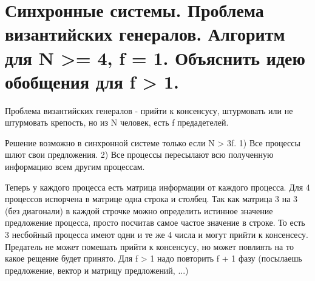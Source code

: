 \section{Синхронные системы. Проблема византийских генералов. Алгоритм для N >= 4, f = 1. Объяснить идею обобщения для f > 1.}

Проблема византийских генералов - прийти к консенсусу, штурмовать или не штурмовать крепость, но из N человек, есть f предадетелей.

Решение возможно в синхронной системе только если N > 3f.
1) Все процессы шлют свои предложения.
2) Все процессы пересылают всю полученную информацию всем другим процессам.

Теперь у каждого процесса есть матрица информации от каждого процесса.
Для 4 процессов испорчена в матрице одна строка и столбец. Так как матрица 3 на 3 (без диагонали) в каждой строчке можно определить истинное значение предложение процесса, просто посчитав самое частое значение в строке.
То есть 3 несбойный процесса имеют одни и те же 4 числа и могут прийти к консенсесу.
Предатель не может помешать прийти к консенсусу, но может повлиять на то какое рещение будет принято.
Для f > 1 надо повторить f + 1 фазу (посылаешь предложение, вектор и матрицу предложений, ...)